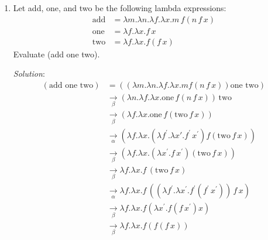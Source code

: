 \documentclass[]{article}
\begin{document}
\begin{enumerate}
\item Let add, one, and two be the following lambda expressions:
\begin{align*}
\text{add} &= \lambda m.\lambda n.\lambda f.\lambda x.m\,f(n\,f\,x) \\
\text{one} &= \lambda f.\lambda x.f\,x \\
\text{two} &= \lambda f.\lambda x.f(f\,x)
\end{align*}
Evaluate (add one two).
\item[\emph{Solution}:]
\begin{align*}
(\textrm{add one two}) &=((\lambda m.\lambda n.\lambda f.\lambda x.m
f(n\,f\,x))\textrm{one}\,\,\text{two})\\
&\underset{\beta}{\rightarrow}(\lambda n.\lambda f.\lambda
x.\textrm{one}\,f(n\,f\,x))\,\textrm{two} \\
&\underset{\beta}{\rightarrow}(\lambda f.\lambda
x.\textrm{one}\,f(\textrm{two}\,f\,x)) \\
&\underset{\alpha}{\rightarrow}(\lambda f.\lambda x.(\lambda f^\prime.\lambda
x\prime.f^\prime\,x^\prime)f(\textrm{two}\,f\,x)) \\
&\underset{\beta}{\rightarrow} (\lambda f.\lambda x.(\lambda
x^\prime.f\,x^\prime)(\textrm{two}\,f\,x)) \\
&\underset{\beta}{\rightarrow} \lambda f.\lambda x.f\,(\textrm{two}\,f\,x) \\
&\underset{\alpha}{\rightarrow} \lambda f.\lambda x.f\,((\lambda
f^\prime.\lambda x^\prime.f^\prime(f^\prime\,x^\prime))\,f\,x) \\
&\underset{\beta}{\rightarrow} \lambda f.\lambda x.f (\lambda
x^\prime.f(f\,x^\prime) x) \\
&\underset{\beta}{\rightarrow} \lambda f.\lambda x.f(f(f\,x))
\end{align*}
\end{enumerate}
\end{document}

